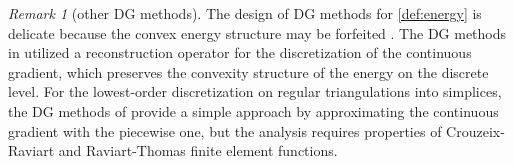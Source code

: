 \documentclass[a4paper]{amsart}
\numberwithin{equation}{section}
\newcommand{\I}{\mathrm{I}}
\newcommand{\Mcal}{\mathcal{M}}
\newcommand{\pw}{\mathrm{pw}}
\theoremstyle{remark}
\newtheorem{remark}[theorem]{Remark}
\begin{document}
\begin{remark}[other DG methods]
The design of DG methods for \eqref{def:energy} is delicate because the convex energy structure may be forfeited \cite{OrtnerSueli2007,GrekasKoumatosMakridakisVikelis2025}.
The DG methods in \cite{EyckLew2006,BurmanErn2008,BuffaOrtner2009} utilized a reconstruction operator for the discretization of the continuous gradient, which preserves the convexity structure of the energy on the discrete level.
For the lowest-order discretization on regular triangulations into simplices, the DG methods of \cite{Bartels2021} provide a simple approach by approximating the continuous gradient with the piecewise one, but the analysis requires properties 
of Crouzeix-Raviart and Raviart-Thomas finite element functions.
\end{remark}

\end{document}
